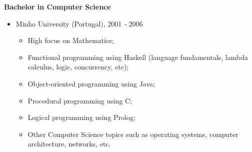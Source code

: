 \documentclass{res}
\def\Minus{\texttt{-}\,}
\begin{document}
\begin{resume}
    {\bf Bachelor in Computer Science}
    \begin{itemize}
      \item[] Minho University (Portugal), 2001 \Minus 2006
      \begin{itemize}
        \item High focus on Mathematics;
        \item Functional programming using Haskell (language fundamentals, lambda calculus, logic, concurrency, etc);
        \item Object-oriented programming using Java;
        \item Procedural programming using C;
        \item Logical programming using Prolog;
        \item Other Computer Science topics such as operating systems, computer architecture, networks, etc.
      \end{itemize}
    \end{itemize}
\end{resume}
\end{document}
